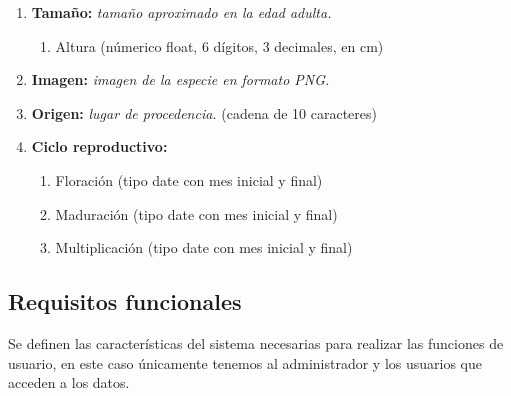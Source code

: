 \documentclass[10pt,a4paper]{article}
\begin{document}
\begin{enumerate}[label={RD\arabic*.} ,leftmargin=2.8\parindent]
\begin{enumerate}[label={RD1.\arabic*.}]
	\medskip
	\item
		\textbf{Tamaño:} \textit{tamaño aproximado en la edad adulta.}
	\begin{enumerate}[label=-]
		\item Altura (númerico float, 6 dígitos, 3 decimales, en cm)
	\end{enumerate}
	
	\medskip	
	\item
		\textbf{Imagen:} \textit{imagen de la especie en formato PNG.}

	\medskip 
	\item
		\textbf{Origen:} \textit{lugar de procedencia.} (cadena de 10 caracteres)
		
	\medskip 
	\item
		\textbf{Ciclo reproductivo:}
	\begin{enumerate} [label=-]
		\item Floración (tipo date con mes inicial y final)
		\item Maduración (tipo date con mes inicial y final)
		\item Multiplicación (tipo date con mes inicial y final)
	\end{enumerate}
						
\end{enumerate}
\end{enumerate}

\subsection{\textbf{Requisitos funcionales}}

Se definen las características del sistema necesarias para realizar las funciones de usuario, en este caso únicamente tenemos al administrador y los usuarios que acceden a los datos.

\bigskip
\end{document}
